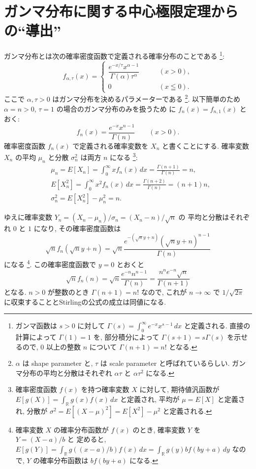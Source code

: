 \documentclass[12pt,twoside]{jarticle}
\newcommand\R{{\mathbb R}} %
\theoremstyle{jplain}
\theoremstyle{jplain}
\theoremstyle{jplain}
\numberwithin{theorem}{section}
\numberwithin{equation}{section}
\numberwithin{figure}{section}
\numberwithin{table}{section}
\begin{document}

\section{ガンマ分布に関する中心極限定理からの``導出''}

ガンマ分布とは次の確率密度函数で定義される確率分布のことである%
\footnote{ガンマ函数は $s>0$ に対して 
$\Gamma(s)=\int_0^\infty e^{-x}x^{s-1}\,dx$ と定義される.
直接の計算によって $\Gamma(1)=1$ を, 
部分積分によって $\Gamma(s+1)=s\Gamma(s)$ を示せるので,
$0$ 以上の整数 $n$ について $\Gamma(n+1)=n!$ となる.}:
\[
f_{\alpha,\tau}(x) =
\begin{cases}
\dfrac{e^{-x/\tau}x^{\alpha-1}}{\Gamma(\alpha)\tau^\alpha} & \qquad (x>0), \\
0 & \qquad (x\leqq 0).
\end{cases}
\]
ここで $\alpha,\tau>0$ はガンマ分布を決めるパラメーターである%
\footnote{$\alpha$ は shape parameter と, 
$\tau$ は scale parameter と呼ばれているらしい.
ガンマ分布の平均と分散はそれぞれ $\alpha\tau$ と $\alpha\tau^2$ になる.}.
以下簡単のため $\alpha=n>0$, $\tau=1$ の場合のガンマ分布のみを扱うため
に $f_n(x)=f_{n,1}(x)$ とおく:
\[
f_n(x) = \frac{e^{-x} x^{n-1}}{\Gamma(n)} \qquad (x>0).
\]
確率密度函数 $f_n(x)$ で定義される確率変数を $X_n$ と書くことにする.
確率変数 $X_n$ の平均 $\mu_n$ と分散 $\sigma_n^2$ は両方 $n$ になる%
\footnote{確率密度函数 $f(x)$ を持つ確率変数 $X$ に対して, 
期待値汎函数が $E[g(X)]=\int_\R g(x)f(x)\,dx$ と定義され, 
平均が $\mu=E[X]$ と定義され, 
分散が $\sigma^2=E[(X-\mu)^2]=E[X^2]-\mu^2$ と定義される.}:
\begin{align*}
&
\mu_n = E[X_n] = \int_0^\infty x f_n(x)\,dx = \frac{\Gamma(n+1)}{\Gamma(n)}=n,
\\ & 
E[X_n^2] = \int_0^\infty x^2 f_n(x)\,dx = \frac{\Gamma(n+2)}{\Gamma(n)}=(n+1)n,
\\ &
\sigma_n^2 = E[X_n^2]-\mu_n^2 = n.
\end{align*}

ゆえに確率変数 $Y_n=(X_n-\mu_n)/\sigma_n=(X_n-n)/\sqrt{n}$ の
平均と分散はそれぞれ $0$ と $1$ になり, その確率密度函数は 
\[
\sqrt{n}f_n(\sqrt{n}y+n)
=
\sqrt{n}\frac{e^{-(\sqrt{n}y+n)}(\sqrt{n}y+n)^{n-1}}{\Gamma(n)}
\]
になる%
\footnote{確率変数 $X$ の確率分布函数が $f(x)$ のとき, 確率変数 $Y$ を $Y=(X-a)/b$ と
定めると, $E[g(Y)]=\int_\R g((x-a)/b)f(x)\,dx = \int_\R g(y) b f(by+a)\,dy$ なので,
$Y$ の確率分布函数は $b f(by+a)$ になる.}. 
この確率密度函数で $y=0$ とおくと
\[
\sqrt{n}f_n(n)
=
\sqrt{n}\frac{e^{-n}n^{n-1}}{\Gamma(n)}
=
\frac{n^n e^{-n}\sqrt{n}}{\Gamma(n+1)}
\]
となる. $n>0$ が整数のとき $\Gamma(n+1)=n!$ なので, 
これが $n\to\infty$ で $1/\sqrt{2\pi}$ に収束することとStirlingの公式の成立は同値になる.
\end{document}
